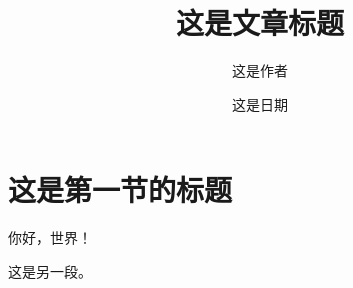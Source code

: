 \documentclass{ctexart}
\title{这是文章标题}
\author{这是作者}
\date{这是日期}
\begin{document}
  \maketitle

  \section{这是第一节的标题}

  你好，世界！

  这是另一段。
\end{document}
